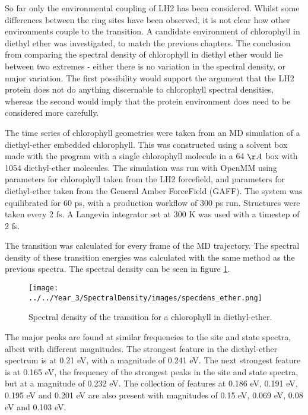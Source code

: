 So far only the environmental coupling of LH2 has been considered. Whilst some differences
between the ring sites have been observed, it is not clear how other environments 
couple to the \Qy transition. A candidate environment of chlorophyll in diethyl 
ether was investigated, to match the previous chapters. The conclusion from comparing
the spectral density of chlorophyll in diethyl ether would lie between two extremes
- either there is no variation in the spectral density, or major variation. The first
possibility would support the argument that the LH2 protein does not do anything 
discernable to chlorophyll spectral densities, whereas the second would imply that
the protein environment does need to be considered more carefully.

The time series of chlorophyll geometries were taken from an MD simulation of a 
diethyl-ether embedded chlorophyll. This was constructed using a solvent box made
with the  program with a single chlorophyll  molecule in a 64 $\AA{}$
box with 1054 diethyl-ether molecules. The simulation was run with OpenMM using
parameters for chlorophyll taken from the LH2 forcefield, and parameters for diethyl-ether
taken from the General Amber ForceField (GAFF). The system was equilibrated for 
60 ps, with a production workflow of 300 ps run. Structures were taken every 2 fs.
A Langevin integrator set at 300 K was used with a timestep of 2 fs.

The \Qy transition was calculated for every frame of the MD trajectory. The spectral
density of these transition energies was calculated with the same method as the 
previous spectra. The spectral density can be seen in figure \ref{fig:specdens_ether}.

\begin{figure}
    \centering
    \texttt{[image: ../../Year\_3/SpectralDensity/images/specdens\_ether.png]}
    \label{fig:specdens_ether}
    \caption{Spectral density of the \Qy transition for a chlorophyll in diethyl-ether.}
\end{figure}

The major peaks are found at similar frequencies to the site and state spectra, albeit
with different magnitudes. The strongest feature in the diethyl-ether spectrum is
at 0.21 eV, with a magnitude of 0.241 eV. The next strongest feature is at 0.165 
eV, the frequency of the strongest peaks in the site and state spectra, but at a
magnitude of 0.232 eV. The collection of features at 0.186 eV, 0.191 eV, 0.195 eV
and 0.201 eV are also present with magnitudes of 0.15 eV, 0.069 eV, 0.08 eV and 
0.103 eV.

